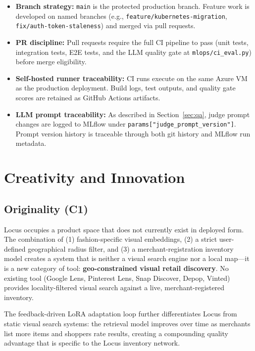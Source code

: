 \documentclass[12pt]{article}
\begin{document}
\begin{itemize}[leftmargin=*]
    \item \textbf{Branch strategy:} \texttt{main} is the protected production branch. Feature work is developed on named branches (e.g., \texttt{feature/kubernetes-migration}, \texttt{fix/auth-token-staleness}) and merged via pull requests.
    \item \textbf{PR discipline:} Pull requests require the full CI pipeline to pass (unit tests, integration tests, E2E tests, and the LLM quality gate at \texttt{mlops/ci\_eval.py}) before merge eligibility.
    \item \textbf{Self-hosted runner traceability:} CI runs execute on the same Azure VM as the production deployment. Build logs, test outputs, and quality gate scores are retained as GitHub Actions artifacts.
    \item \textbf{LLM prompt traceability:} As described in Section~\ref{sec:qa}, judge prompt changes are logged to MLflow under \texttt{params["judge\_prompt\_version"]}. Prompt version history is traceable through both git history and MLflow run metadata.
\end{itemize}

\section{Creativity and Innovation}
\label{sec:creativity}

\subsection{Originality (C1)}

Locus occupies a product space that does not currently exist in deployed form. The combination of (1) fashion-specific visual embeddings, (2) a strict user-defined geographical radius filter, and (3) a merchant-registration inventory model creates a system that is neither a visual search engine nor a local map---it is a new category of tool: \textbf{geo-constrained visual retail discovery}. No existing tool (Google Lens, Pinterest Lens, Snap Discover, Depop, Vinted) provides locality-filtered visual search against a live, merchant-registered inventory.

The feedback-driven LoRA adaptation loop further differentiates Locus from static visual search systems: the retrieval model improves over time as merchants list more items and shoppers rate results, creating a compounding quality advantage that is specific to the Locus inventory network.
\end{document}
